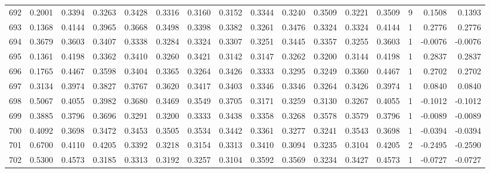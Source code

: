 \begin{tabular}{lrrrrrrrrrrrrrrr}
692 &      0.2001 &  0.3394 &  0.3263 &  0.3428 &  0.3316 &  0.3160 &  0.3152 &  0.3344 &  0.3240 &  0.3509 &   0.3221 &     0.3509 &      9 &                    0.1508 &                     0.1393 \\
693 &      0.1368 &  0.4144 &  0.3965 &  0.3668 &  0.3498 &  0.3398 &  0.3382 &  0.3261 &  0.3476 &  0.3324 &   0.3324 &     0.4144 &      1 &                    0.2776 &                     0.2776 \\
694 &      0.3679 &  0.3603 &  0.3407 &  0.3338 &  0.3284 &  0.3324 &  0.3307 &  0.3251 &  0.3445 &  0.3357 &   0.3255 &     0.3603 &      1 &                   -0.0076 &                    -0.0076 \\
695 &      0.1361 &  0.4198 &  0.3362 &  0.3410 &  0.3260 &  0.3421 &  0.3142 &  0.3147 &  0.3262 &  0.3200 &   0.3144 &     0.4198 &      1 &                    0.2837 &                     0.2837 \\
696 &      0.1765 &  0.4467 &  0.3598 &  0.3404 &  0.3365 &  0.3264 &  0.3426 &  0.3333 &  0.3295 &  0.3249 &   0.3360 &     0.4467 &      1 &                    0.2702 &                     0.2702 \\
697 &      0.3134 &  0.3974 &  0.3827 &  0.3767 &  0.3620 &  0.3417 &  0.3403 &  0.3346 &  0.3346 &  0.3264 &   0.3426 &     0.3974 &      1 &                    0.0840 &                     0.0840 \\
698 &      0.5067 &  0.4055 &  0.3982 &  0.3680 &  0.3469 &  0.3549 &  0.3705 &  0.3171 &  0.3259 &  0.3130 &   0.3267 &     0.4055 &      1 &                   -0.1012 &                    -0.1012 \\
699 &      0.3885 &  0.3796 &  0.3696 &  0.3291 &  0.3200 &  0.3333 &  0.3438 &  0.3358 &  0.3268 &  0.3578 &   0.3579 &     0.3796 &      1 &                   -0.0089 &                    -0.0089 \\
700 &      0.4092 &  0.3698 &  0.3472 &  0.3453 &  0.3505 &  0.3534 &  0.3442 &  0.3361 &  0.3277 &  0.3241 &   0.3543 &     0.3698 &      1 &                   -0.0394 &                    -0.0394 \\
701 &      0.6700 &  0.4110 &  0.4205 &  0.3392 &  0.3218 &  0.3154 &  0.3313 &  0.3410 &  0.3094 &  0.3235 &   0.3104 &     0.4205 &      2 &                   -0.2495 &                    -0.2590 \\
702 &      0.5300 &  0.4573 &  0.3185 &  0.3313 &  0.3192 &  0.3257 &  0.3104 &  0.3592 &  0.3569 &  0.3234 &   0.3427 &     0.4573 &      1 &                   -0.0727 &                    -0.0727 \\

\end{tabular}
